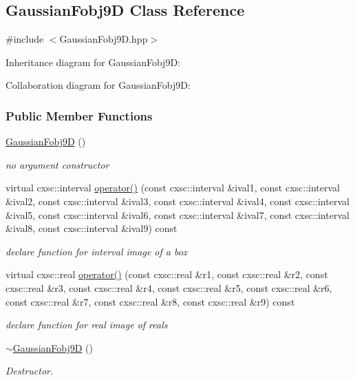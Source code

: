 \hypertarget{classGaussianFobj9D}{\subsection{\-Gaussian\-Fobj9\-D \-Class \-Reference}
\label{classGaussianFobj9D}
}


{\ttfamily \#include $<$\-Gaussian\-Fobj9\-D.\-hpp$>$}



\-Inheritance diagram for \-Gaussian\-Fobj9\-D\-:


\-Collaboration diagram for \-Gaussian\-Fobj9\-D\-:
\subsubsection*{\-Public \-Member \-Functions}
\begin{DoxyCompactItemize}
\item 
\hyperlink{classGaussianFobj9D_a312e0cad649a51d2073db49b06063971}{\-Gaussian\-Fobj9\-D} ()
\begin{DoxyCompactList}\small\item\em no argument constructor \end{DoxyCompactList}\item 
virtual cxsc\-::interval \hyperlink{classGaussianFobj9D_a7ccadd3c4d58fb52fa86ce4d709467e2}{operator()} (const cxsc\-::interval \&ival1, const cxsc\-::interval \&ival2, const cxsc\-::interval \&ival3, const cxsc\-::interval \&ival4, const cxsc\-::interval \&ival5, const cxsc\-::interval \&ival6, const cxsc\-::interval \&ival7, const cxsc\-::interval \&ival8, const cxsc\-::interval \&ival9) const 
\begin{DoxyCompactList}\small\item\em declare function for interval image of a box \end{DoxyCompactList}\item 
virtual cxsc\-::real \hyperlink{classGaussianFobj9D_a8342007dc63e0cd461aba33dbea2f62e}{operator()} (const cxsc\-::real \&r1, const cxsc\-::real \&r2, const cxsc\-::real \&r3, const cxsc\-::real \&r4, const cxsc\-::real \&r5, const cxsc\-::real \&r6, const cxsc\-::real \&r7, const cxsc\-::real \&r8, const cxsc\-::real \&r9) const 
\begin{DoxyCompactList}\small\item\em declare function for real image of reals \end{DoxyCompactList}\item 
\hyperlink{classGaussianFobj9D_a29092581a37d5ad78f68cf0f1ca27f4b}{$\sim$\-Gaussian\-Fobj9\-D} ()
\begin{DoxyCompactList}\small\item\em \-Destructor. \end{DoxyCompactList}\end{DoxyCompactItemize}


